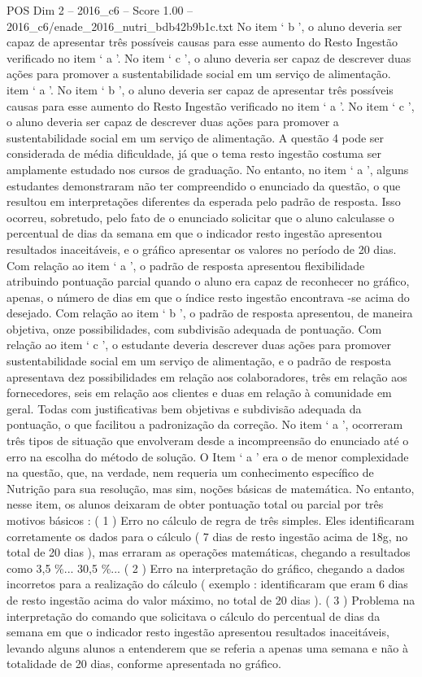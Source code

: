 \begin{textsample}{POS Dim 2 – 2016\_c6 – Score 1.00 – 2016\_c6/enade\_2016\_nutri\_bdb42b9b1c.txt}
No item ‘ b ’, o aluno deveria ser capaz de apresentar três possíveis causas para esse aumento do Resto Ingestão verificado no item ‘ a ’.
No item ‘ c ’, o aluno deveria ser capaz de descrever duas ações para promover a sustentabilidade social em um serviço de alimentação. item ‘ a ’.
No item ‘ b ’, o aluno deveria ser capaz de apresentar três possíveis causas para esse aumento do Resto Ingestão verificado no item ‘ a ’.
No item ‘ c ’, o aluno deveria ser capaz de descrever duas ações para promover a sustentabilidade social em um serviço de alimentação.
A questão 4 pode ser considerada de média dificuldade, já que o tema resto ingestão costuma ser amplamente estudado nos cursos de graduação.
No entanto, no item ‘ a ’, alguns estudantes demonstraram não ter compreendido o enunciado da questão, o que resultou em interpretações diferentes da esperada pelo padrão de resposta.
Isso ocorreu, sobretudo, pelo fato de o enunciado solicitar que o aluno calculasse o percentual de dias da semana em que o indicador resto ingestão apresentou resultados inaceitáveis, e o gráfico apresentar os valores no período de 20 dias.
Com relação ao item ‘ a ’, o padrão de resposta apresentou flexibilidade atribuindo pontuação parcial quando o aluno era capaz de reconhecer no gráfico, apenas, o número de dias em que o índice resto ingestão encontrava -se acima do desejado.
Com relação ao item ‘ b ’, o padrão de resposta apresentou, de maneira objetiva, onze possibilidades, com subdivisão adequada de pontuação.
Com relação ao item ‘ c ’, o estudante deveria descrever duas ações para promover sustentabilidade social em um serviço de alimentação, e o padrão de resposta apresentava dez possibilidades em relação aos colaboradores, três em relação aos fornecedores, seis em relação aos clientes e duas em relação à comunidade em geral.
Todas com justificativas bem objetivas e subdivisão adequada da pontuação, o que facilitou a padronização da correção.
No item ‘ a ’, ocorreram três tipos de situação que envolveram desde a incompreensão do enunciado até o erro na escolha do método de solução.
O Item ‘ a ’ era o de menor complexidade na questão, que, na verdade, nem requeria um conhecimento específico de Nutrição para sua resolução, mas sim, noções básicas de matemática.
No entanto, nesse item, os alunos deixaram de obter pontuação total ou parcial por três motivos básicos : ( 1 ) Erro no cálculo de regra de três simples.
Eles identificaram corretamente os dados para o cálculo ( 7 dias de resto ingestão acima de 18g, no total de 20 dias ), mas erraram as operações matemáticas, chegando a resultados como 3,5 \%... 30,5 \%... ( 2 ) Erro na interpretação do gráfico, chegando a dados incorretos para a realização do cálculo ( exemplo : identificaram que eram 6 dias de resto ingestão acima do valor máximo, no total de 20 dias ). ( 3 ) Problema na interpretação do comando que solicitava o cálculo do percentual de dias da semana em que o indicador resto ingestão apresentou resultados inaceitáveis, levando alguns alunos a entenderem que se referia a apenas uma semana e não à totalidade de 20 dias, conforme apresentada no gráfico.

\end{textsample}
